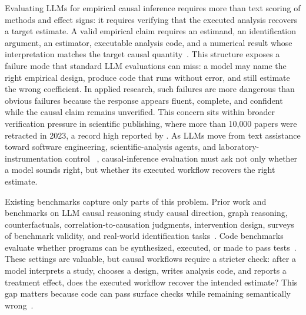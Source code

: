 \documentclass{article}
\begin{document}
Evaluating LLMs for empirical causal inference requires more than text
scoring of methods and effect signs: it requires verifying that the
executed analysis recovers a target estimate. A valid empirical claim
requires an estimand, an identification argument, an estimator,
executable analysis code, and a numerical result whose interpretation
matches the target causal quantity~\citep{rubin1974estimating,
rosenbaum1983central,holland1986statistics,pearl2009causality,
imbens2015causal,angrist2009mostly}. This structure exposes a failure mode that standard
LLM evaluations can miss: a model may name the right empirical design,
produce code that runs without error, and still estimate the wrong
coefficient. In applied research, such failures are more dangerous than
obvious failures because the response appears fluent, complete, and
confident while the causal claim remains unverified. This concern sits
within broader verification pressure in scientific publishing, where
more than 10{,}000 papers were retracted in 2023, a record high
reported by \citet{vannoorden2023retractions}. As LLMs move from text
assistance toward software engineering, scientific-analysis agents, and
laboratory-instrumentation control
~\citep{gao2023pal,yao2023react,schick2023toolformer,
liu2023agentbench,wu2023autogen,huang2024mlagentbench,
jimenez2024swe,majumder2024discoverybench,chen2024scienceagentbench,
xie2025autonomouslab},
causal-inference evaluation must ask not
only whether a model sounds right, but whether its executed workflow
recovers the right estimate.

Existing benchmarks capture only parts of this problem. Prior work
and benchmarks on LLM causal reasoning study causal direction, graph
reasoning, counterfactuals, correlation-to-causation judgments,
intervention design, surveys of benchmark validity, and real-world
identification tasks~\citep{kiciman2023causal,zecevic2023causalparrots,
jin2023cladder,jin2024corr2cause,chen2024clear,chi2024unveiling,
yang2024criticalreview,ma2025causalsurvey,zhou2024causalbench,
acharya2025causcibench,lee2025econcausal,shi2026intervenebench,
sawarni2026causalreasoningbenchmark}. Code benchmarks evaluate whether
programs can be synthesized, executed, or made to pass
tests~\citep{chen2021codex,austin2021program,hendrycks2021apps,
li2022alphacode,lu2021codexglue,cassano2023multiple,lai2023ds1000,
gu2024cruxeval,jimenez2024swe,jain2024livecodebench,
zhuo2024bigcodebench}. These
settings are valuable, but causal workflows require a stricter check:
after a model interprets a study, chooses a design, writes analysis
code, and reports a treatment effect, does the executed workflow
recover the intended estimate? This gap matters because code can
pass surface checks while remaining semantically
wrong~\citep{liu2023chatgptcode}.
\end{document}
